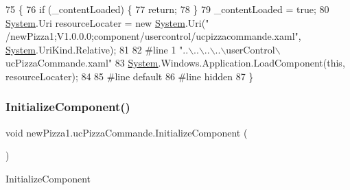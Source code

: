 \begin{DoxyCode}
75                                           \{
76             \textcolor{keywordflow}{if} (\_contentLoaded) \{
77                 \textcolor{keywordflow}{return};
78             \}
79             \_contentLoaded = \textcolor{keyword}{true};
80             \hyperlink{namespaceSystem}{System}.Uri resourceLocater = \textcolor{keyword}{new} \hyperlink{namespaceSystem}{System}.Uri(\textcolor{stringliteral}{"
      /newPizza1;V1.0.0.0;component/usercontrol/ucpizzacommande.xaml"}, \hyperlink{namespaceSystem}{System}.UriKind.Relative);
81             
82 \textcolor{preprocessor}{            #line 1 "..\(\backslash\)..\(\backslash\)..\(\backslash\)..\(\backslash\)userControl\(\backslash\)ucPizzaCommande.xaml"}
83             \hyperlink{namespaceSystem}{System}.Windows.Application.LoadComponent(\textcolor{keyword}{this}, resourceLocater);
84             
85 \textcolor{preprocessor}{            #line default}
86 \textcolor{preprocessor}{            #line hidden}
87         \}
\end{DoxyCode}
\mbox{\label{classnewPizza1_1_1ucPizzaCommande_a64b08961b7d2239fe9cf481dad628572}} 
\subsubsection{\texorpdfstring{Initialize\+Component()}{InitializeComponent()}\hspace{0.1cm}{\footnotesize\ttfamily [4/4]}}
{\footnotesize\ttfamily void new\+Pizza1.\+uc\+Pizza\+Commande.\+Initialize\+Component (\begin{DoxyParamCaption}{ }\end{DoxyParamCaption})\hspace{0.3cm}{\ttfamily [inline]}}



Initialize\+Component 


